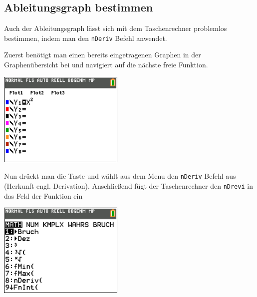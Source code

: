 \subsection{Ableitungsgraph bestimmen}\label{sec:Ableitungsgraph bestimmen}
Auch der Ableitungsgraph lässt sich mit dem Taschenrechner problemlos bestimmen, indem man den \texttt{nDeriv} Befehl anwendet. 
\begin{paracol}{2}
\begin{flushleft}
	Zuerst benötigt man einen bereits eingetragenen Graphen in der Graphenübersicht bei  und navigiert auf die nächste freie Funktion.
\end{flushleft}
\switchcolumn
\begin{flushright}
\includegraphics[width=6cm]{Media/GRT/Visualisierung/ableitung_bestimmen/ableitung_bestimmen_1.png}
\end{flushright}
\end{paracol}

\begin{paracol}{2}
\begin{flushleft}
	Nun drückt man die Taste  und wählt aus dem Menu den \texttt{nDeriv} Befehl aus (Herkunft engl. Derivation). Anschließend fügt der Taschenrechner den \texttt{nDrevi} in das Feld der Funktion ein
\end{flushleft}	
\switchcolumn
\begin{flushright}
\includegraphics[width=6cm]{Media/GRT/Visualisierung/ableitung_bestimmen/ableitung_bestimmen_2.png}
\end{flushright}
\end{paracol}

